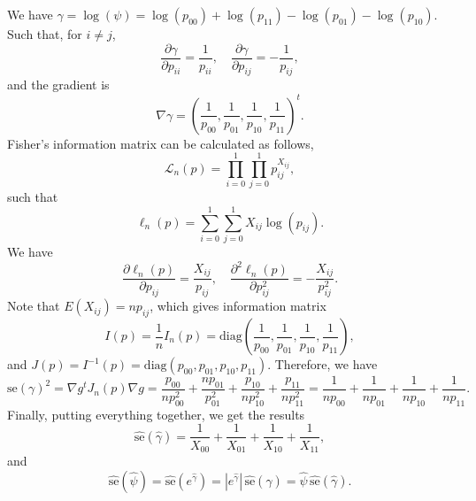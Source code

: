 We have $\gamma = \log(\psi) = \log(p_{00}) + \log(p_{11}) - \log(p_{01}) - \log(p_{10})$.
Such that, for $i \neq j$,
\begin{equation*}
    \frac{\partial \gamma}{\partial p_{ii}} = \frac{1}{p_{ii}}, \quad
    \frac{\partial \gamma}{\partial p_{ij}} = -\frac{1}{p_{ij}},
\end{equation*}
and the gradient is
\begin{equation*}
    \nabla \gamma = \left(\frac{1}{p_{00}}, \frac{1}{p_{01}}, \frac{1}{p_{10}}, \frac{1}{p_{11}}\right)^t.
\end{equation*}
Fisher's information matrix can be calculated as follows,
\begin{equation*}
    \mathcal{L}_n(p) = \prod_{i = 0}^1 \prod_{j = 0}^1 p_{ij}^{X_{ij}},
\end{equation*}
such that
\begin{equation*}
    \ell_n(p) = \sum_{i = 0}^1 \sum_{j = 0}^1 X_{ij} \log(p_{ij}).
\end{equation*}
We have
\begin{equation*}
    \frac{\partial \ell_n(p)}{\partial p_{ij}} = \frac{X_{ij}}{p_{ij}}, \quad
    \frac{\partial^2 \ell_n(p)}{\partial p_{ij}^2} = -\frac{X_{ij}}{p_{ij}^2}.
\end{equation*}
Note that $E(X_{ij}) = np_{ij}$, which gives information matrix
\begin{equation*}
    I(p) = \frac{1}{n} I_n(p) = \textrm{diag}\left(\frac{1}{p_{00}}, \frac{1}{p_{01}}, \frac{1}{p_{10}}, \frac{1}{p_{11}}\right),
\end{equation*}
and $J(p) = I^{-1}(p) = \textrm{diag}(p_{00}, p_{01}, p_{10}, p_{11})$.
Therefore, we have
\begin{equation*}
    \mathrm{se}(\gamma)^2 = \nabla g^t J_n(p) \nabla g
        = \frac{p_{00}}{np_{00}^2} + \frac{np_{01}}{p_{01}^2} + \frac{p_{10}}{np_{10}^2} + \frac{p_{11}}{np_{11}^2}
        = \frac{1}{np_{00}} + \frac{1}{np_{01}} + \frac{1}{np_{10}} + \frac{1}{np_{11}}.
\end{equation*}
Finally, putting everything together, we get the results
\begin{equation*}
    \hat{\mathrm{se}}(\hat{\gamma}) = \frac{1}{X_{00}} + \frac{1}{X_{01}} + \frac{1}{X_{10}} + \frac{1}{X_{11}},
\end{equation*}
and
\begin{equation*}
    \hat{\mathrm{se}}(\hat{\psi}) = \hat{\mathrm{se}}(e^{\hat{\gamma}})
        = |e^{\hat{\gamma}}|\,\hat{\mathrm{se}}(\hat{\gamma})
        = \hat{\psi}\,\hat{\mathrm{se}}(\hat{\gamma}).
\end{equation*}


